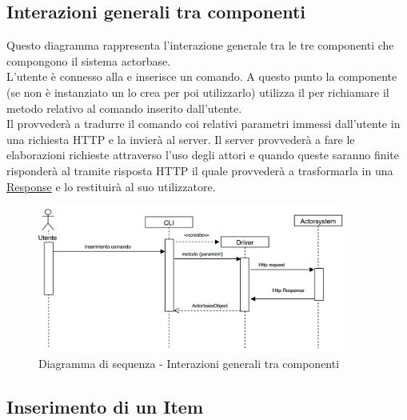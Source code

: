 \documentclass{scalatekids-article}
\begin{document}
\subsection{Interazioni generali tra componenti}
Questo diagramma rappresenta l'interazione generale tra le tre componenti che
compongono il sistema actorbase.\\
L'utente è connesso alla  e inserisce un comando. A questo punto la
componente  (se non è instanziato un  lo crea per poi
utilizzarlo) utilizza il  per richiamare il metodo relativo al
comando inserito dall'utente.\\Il {} provvederà a tradurre il
comando coi relativi parametri immessi dall'utente in una richiesta HTTP
e la invierà al server. Il server provvederà a fare le elaborazioni richieste attraverso l'uso
degli attori e quando queste saranno finite risponderà al 
tramite risposta HTTP il quale provvederà a trasformarla in una
\hyperref[sec:actorbase::driver::client::api::Response]{Response} e lo
restituirà al suo utilizzatore.
\begin{figure}[H]
  \begin{center}
    \includegraphics[width=0.9\textwidth, keepaspectratio]{img/diagrammiSequenza/ScambioMessaggiGenerico.png}
    \caption{Diagramma di sequenza - Interazioni generali tra componenti}
  \end{center}
\end{figure}

\subsection{Inserimento di un Item}
\end{document}
